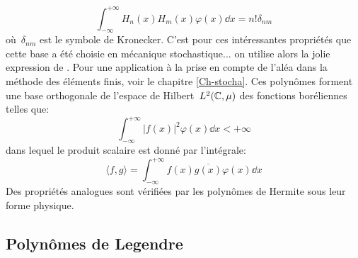 \begin{equation}
  \int_{-\infty}^{+\infty} H_n(x)H_m(x)\varphi(x)\dd x=n!\delta_{nm} 
\end{equation}
où~$\delta_{nm}$ est le symbole de Kronecker. C'est pour ces intéressantes propriétés que cette base a été choisie en mécanique stochastique... on utilise alors la jolie expression de . 
Pour une application à la prise en compte de l'aléa dans la méthode des éléments finis, voir le chapitre \ref{Ch-stocha}.
Ces polynômes forment une base orthogonale de l'espace de Hilbert~$L^2(\mathbb C,\mu)$ des fonctions boréliennes telles que: 
\begin{equation}
\int_{-\infty}^{+\infty}|f(x)|^2\varphi(x)\dd x< +\infty
\end{equation}
dans lequel le produit scalaire est donné par l'intégrale: 
\begin{equation}
\langle f,g\rangle=\int_{-\infty}^{+\infty} f(x)\overline{g(x)}\varphi(x)\dd x
\end{equation}
Des propriétés analogues sont vérifiées par les polynômes de Hermite sous leur forme physique. 

\medskip
\subsection{Polynômes de Legendre} 


